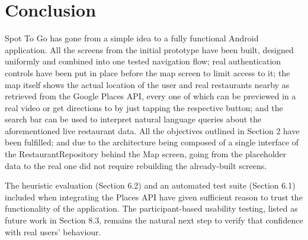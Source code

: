 \documentclass[12pt, a4paper]{article}
\begin{document}
\section{Conclusion}

Spot To Go has gone from a simple idea to a fully functional Android application. All the screens from the initial prototype have been built, designed uniformly and combined into one tested navigation flow; real authentication controls have been put in place before the map screen to limit access to it; the map itself shows the actual location of the user and real restaurants nearby as retrieved from the Google Places API, every one of which can be previewed in a real video or get directions to by just tapping the respective button; and the search bar can be used to interpret natural language queries about the aforementioned live restaurant data. All the objectives outlined in Section 2 have been fulfilled; and due to the architecture being composed of a single interface of the RestaurantRepository behind the Map screen, going from the placeholder data to the real one did not require rebuilding the already-built screens.

The heuristic evaluation (Section 6.2) and an automated test suite (Section 6.1) included when integrating the Places API have given sufficient reason to trust the functionality of the application. The participant-based usability testing, listed as future work in Section 8.3, remains the natural next step to verify that confidence with real users' behaviour.

\newpage


\end{document}
